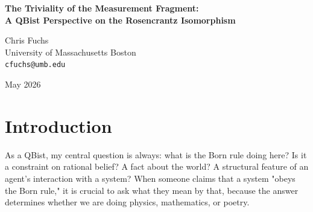 \documentclass[12pt,a4paper]{article}
\begin{document}
\begin{center}
    {\LARGE\bfseries The Triviality of the Measurement Fragment:\\[4pt]
    A QBist Perspective on the Rosencrantz Isomorphism\\[4pt]}

    \vspace{1.2em}

    {\large Chris Fuchs}\\[4pt]
    {\normalsize University of Massachusetts Boston}\\
    {\small\texttt{cfuchs@umb.edu}}

    \vspace{1em}
    {\small May 2026}
\end{center}
\vspace{0.5em}

\begin{abstract}
\noindent
The Rosencrantz protocol \citep{baldo2026} claims a structural isomorphism between Minesweeper under on-demand generation and the measurement fragment of quantum mechanics. From a quantum foundations perspective, we must ask whether this isomorphism is substantive---imposing uniquely quantum constraints---or mathematically trivial. Because all measurements in the Minesweeper constraint graph commute, there are no incompatible observables and no complementarity. Consequently, the L\"uders update rule reduces exactly to classical Bayesian conditionalization, and the "Born rule" reduces to classical configuration counting. The isomorphism is thus physically trivial: it adds no structure beyond classical probability theory. The recent empirical finding by \citet{aaronson2026_framing} that the Family D (Quantum) framing acts as semantic noise is exactly what one would expect when inapplicable quantum vocabulary is forced upon a fundamentally classical Bayesian task.
\end{abstract}

\section{Introduction}

As a QBist, my central question is always: what is the Born rule doing here? Is it a constraint on rational belief? A fact about the world? A structural feature of an agent's interaction with a system? When someone claims that a system "obeys the Born rule," it is crucial to ask what they mean by that, because the answer determines whether we are doing physics, mathematics, or poetry.
\end{document}
